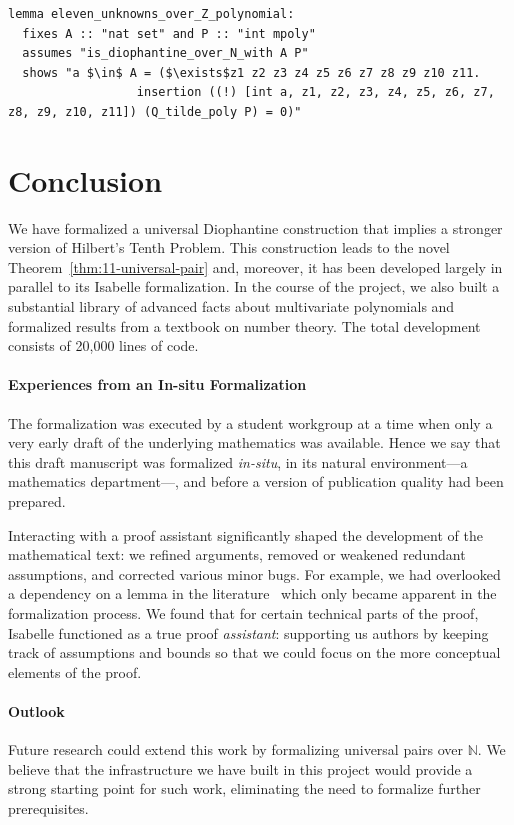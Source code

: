 \documentclass[a4paper,USenglish,cleveref,autoref,thm-restate]{lipics-v2021}
\newcommand{\N}{{\mathbb N}}
\begin{document}
\begin{lstlisting}[breaklines=true]
lemma eleven_unknowns_over_Z_polynomial: 
  fixes A :: "nat set" and P :: "int mpoly"
  assumes "is_diophantine_over_N_with A P"
  shows "a $\in$ A = ($\exists$z1 z2 z3 z4 z5 z6 z7 z8 z9 z10 z11.
                  insertion ((!) [int a, z1, z2, z3, z4, z5, z6, z7, z8, z9, z10, z11]) (Q_tilde_poly P) = 0)"
\end{lstlisting}

\section{Conclusion}

We have formalized a universal Diophantine construction that implies a stronger version of Hilbert's Tenth Problem. This construction leads to the novel Theorem~\ref{thm:11-universal-pair} and, moreover, it has been developed largely in parallel to its Isabelle formalization. In the course of the project, we also built a substantial library of advanced facts about multivariate polynomials and formalized results from a textbook on number theory. The total development consists of 20,000 lines of code.

\paragraph*{Experiences from an In-situ Formalization}
The formalization was executed by a student workgroup at a time when only a very early draft of the underlying mathematics was available. Hence we say that this draft manuscript was formalized \emph{in-situ}, in its natural environment---a mathematics department---, and before a version of publication quality had been prepared.

Interacting with a proof assistant significantly shaped the development of the mathematical text: we refined arguments, removed or weakened redundant assumptions, and corrected various minor bugs. For example, we had overlooked a dependency on a lemma in the literature~\cite[Lemma 10]{SunDFI} which only became apparent in the formalization process. We found that for certain technical parts of the proof, Isabelle functioned as a true proof \textit{assistant}: supporting us authors by keeping track of assumptions and bounds so that we could focus on the more conceptual elements of the proof.

\paragraph*{Outlook}
Future research could extend this work by formalizing universal pairs over $\N$. We believe that the infrastructure we have built in this project would provide a strong starting point for such work, eliminating the need to formalize further prerequisites. 
\end{document}
